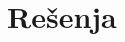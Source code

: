 \begin{comment}

\begin{Exercise}[label=p2.5_04] 
 Deda Mraz planira kupovinu poklona za studente koji su vredno učili C u toku godine. Na njegovoj listi se nalazi ime i prezime studenta (niske dužina do 50 karaktera) i njegova želja (niska maksimalne dužine 100 karaktera). Napisati program koji će služiti Deda Mrazu kao podsetnik: na osnovu liste koju je napravio, Deda Mraz može da unese ime i prezime studenta i da proveri njegovu želju. Ako ima više studenata sa istim imenom i prezimenom ispisati sve želje. \textit{Napomena: probati sa testiranjem zadataka pomoću preusmeravanja.}\\
\begin{maxitest}
\begin{upotreba}{1}
#\naslovInt#
#\izlaz{Ime i prezime studenta:}#
#\ulaz{Pera Peric}#
#\izlaz{Njegova zelja:}#
#\ulaz{privezak za kljuceve}#
#\izlaz{Jos vrednih studenata (da/ne)?}#
#\ulaz{da}#
#\izlaz{Ime i prezime studenta:}#
#\ulaz{Zika Zikic}#
#\izlaz{Njegova zelja:}#
#\ulaz{stap za pecanje}#
#\izlaz{Jos vrednih studenata (da/ne)?}#
#\ulaz{da}#
#\izlaz{Ime i prezime studenta:}#
#\ulaz{Mara Maric}#
#\izlaz{Njegova zelja:}#
#\ulaz{komplet Knutovih knjiga}#
#\izlaz{Jos vrednih studenata (da/ne)?}#
#\ulaz{ne}#
#\izlaz{Za podsecanje uneti ime i prezime:}#
#\ulaz{Pera Peric}#
#\izlaz{Novogodisnja zelja: privezak za kljuceve}#
\end{upotreba}
\end{maxitest}

\linkresenje{p2.5_04}
\end{Exercise}
\ifresenja
\begin{Answer}[ref=p2.5_04]
\includecode{resenja/3_PredstavljanjePodataka/2.5_Strukture/praktikumi13/4.c}
\end{Answer}
\fi



\end{comment}

\ifresenja
\section{Rešenja}
\shipoutAnswer
\fi


